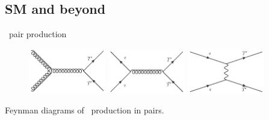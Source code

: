 \subsection{SM and beyond}

\begin{frame}{\Tp~pair production}
\vspace{-.2cm}
\begin{figure}[!Hhtbp]
  \begin{center}
    \includegraphics[width=0.3\textwidth]{../figs/Gluon_fusion_T_pair.jpg}
    \includegraphics[width=0.3\textwidth]{../figs/Quarks_schannel_T_pair.jpg}
    \includegraphics[width=0.3\textwidth]{../figs/Gluon_tchannel_T_pair.jpg}
  \end{center}
\end{figure}

\vspace{-.2cm}
    \begin{block}{}
      \tiny \centering Feynman diagrams of \Tp~production in pairs.
    \end{block}

\end{frame}

